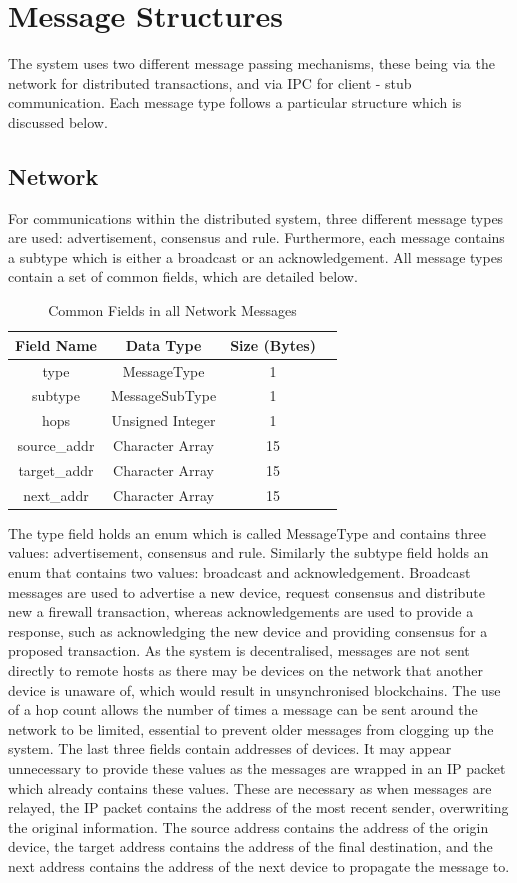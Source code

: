 \documentclass[a4paper, 11pt]{report}
\begin{document}
\section{Message Structures}
The system uses two different message passing mechanisms, these being via the network for distributed transactions, and via \acrshort{IPC} for client - stub communication. Each message type follows a particular structure which is discussed below.

\subsection{Network} \label{netstruct}
For communications within the distributed system, three different message types are used: advertisement, consensus and rule. Furthermore, each message contains a subtype which is either a broadcast or an acknowledgement. All message types contain a set of common fields, which are detailed below.

\begin{table}[H]
\centering
\begin{tabular}{ |c|c|c|c| } 
\hline
Field Name & Data Type & Size (Bytes) \\
\hline
type & MessageType & 1 \\ 
subtype & MessageSubType & 1 \\ 
hops & Unsigned Integer & 1 \\ 
source_addr & Character Array & 15 \\
target_addr & Character Array & 15 \\
next_addr & Character Array & 15 \\
\hline
\end{tabular}
\caption{Common Fields in all Network Messages}
\label{tab:common}
\end{table}

The type field holds an enum which is called MessageType and contains three values: advertisement, consensus and rule. Similarly the subtype field holds an enum that contains two values: broadcast and acknowledgement. Broadcast messages are used to advertise a new device, request consensus and distribute new a firewall transaction, whereas acknowledgements are used to provide a response, such as acknowledging the new device and providing consensus for a proposed transaction. As the system is decentralised, messages are not sent directly to remote hosts as there may be devices on the network that another device is unaware of, which would result in unsynchronised \gls{blockchain}s. The use of a hop count allows the number of times a message can be sent around the network to be limited, essential to prevent older messages from clogging up the system. The last three fields contain addresses of devices. It may appear unnecessary to provide these values as the messages are wrapped in an \acrshort{IP} packet which already contains these values. These are necessary as when messages are relayed, the \acrshort{IP} packet contains the address of the most recent sender, overwriting the original information. The source address contains the address of the origin device, the target address contains the address of the final destination, and the next address contains the address of the next device to propagate the message to.
\end{document}
